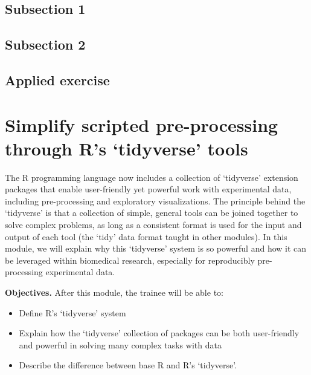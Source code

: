 \documentclass[]{tufte-book}
\providecommand{\tightlist}{%
  \setlength{\itemsep}{0pt}\setlength{\parskip}{0pt}}
\begin{document}
\hypertarget{subsection-1-8}{%
\subsection{Subsection 1}\label{subsection-1-8}}

\hypertarget{subsection-2-7}{%
\subsection{Subsection 2}\label{subsection-2-7}}

\hypertarget{applied-exercise-4}{%
\subsection{Applied exercise}\label{applied-exercise-4}}

\hypertarget{simplify-scripted-pre-processing-through-rs-tidyverse-tools}{%
\section{Simplify scripted pre-processing through R's `tidyverse' tools}\label{simplify-scripted-pre-processing-through-rs-tidyverse-tools}}

The R programming language now includes a collection of `tidyverse' extension
packages that enable user-friendly yet powerful work with experimental data,
including pre-processing and exploratory visualizations. The principle behind
the `tidyverse' is that a collection of simple, general tools can be joined
together to solve complex problems, as long as a consistent format is used for
the input and output of each tool (the `tidy' data format taught in other
modules). In this module, we will explain why this `tidyverse' system is so
powerful and how it can be leveraged within biomedical research, especially for
reproducibly pre-processing experimental data.

\textbf{Objectives.} After this module, the trainee will be able to:

\begin{itemize}
\tightlist
\item
  Define R's `tidyverse' system
\item
  Explain how the `tidyverse' collection of packages can be both user-friendly
  and powerful in solving many complex tasks with data
\item
  Describe the difference between base R and R's `tidyverse'.
\end{itemize}
\end{document}
